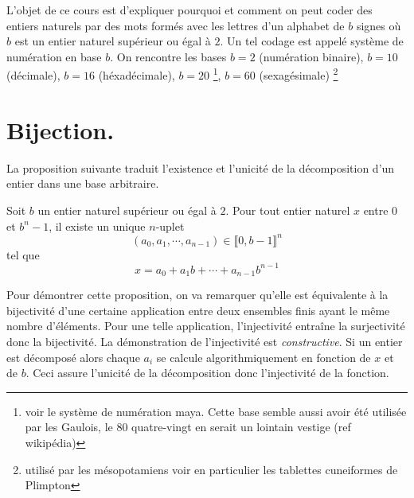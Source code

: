



L'objet de ce cours est d'expliquer pourquoi et comment on peut coder des entiers naturels par des mots formés avec les lettres d'un alphabet de $b$ signes où $b$ est un entier naturel supérieur ou égal à $2$. Un tel codage est appelé système de numération en base $b$.\newline
On rencontre les bases $b=2$ (numération binaire), $b=10$ (décimale), $b=16$ (héxadécimale), $b=20$ \footnote{voir le système de numération maya. Cette base semble aussi avoir été utilisée par les Gaulois, le 80 quatre-vingt en serait un lointain vestige (ref wikipédia) }, $b=60$ (sexagésimale) \footnote{utilisé par les mésopotamiens voir en particulier les tablettes cuneiformes de Plimpton}
\section{Bijection.}
La proposition suivante traduit l'existence et l'unicité de la décomposition d'un entier dans une base arbitraire. 
\begin{prop}
 Soit $b$ un entier naturel supérieur ou égal à $2$. Pour tout entier naturel $x$ entre $0$ et $b^n-1$, il existe un unique $n$-uplet
\begin{displaymath}
 (a_0,a_1,\cdots,a_{n-1})\in \llbracket 0,b-1\rrbracket^n
\end{displaymath}
tel que 
\begin{displaymath}
 x = a_0 + a_1 b +\cdots +a_{n-1}b^{n-1}
\end{displaymath}
\end{prop}

Pour démontrer cette proposition, on va remarquer qu'elle est équivalente à la bijectivité d'une certaine application entre deux ensembles finis ayant le même nombre d'éléments. Pour une telle application, l'injectivité entraîne la surjectivité donc la bijectivité.\newline
La démonstration de l'injectivité est \emph{constructive}. Si un entier est décomposé alors chaque $a_i$ se calcule algorithmiquement en fonction de $x$ et de $b$. Ceci assure l'unicité de la décomposition donc l'injectivité de la fonction.

